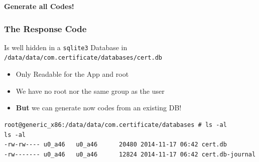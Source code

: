 \documentclass[12pt,a4paper]{beamer}
\newcommand{\mybox}[1]{\par\noindent\colorbox{shadecolor}
{\color{textcolor}\parbox{\dimexpr\textwidth-2\fboxsep\relax}{\fontsize{3em}{3.5em}\selectfont\textbf{{#1}}}}}
\begin{document}
{
\begin{frame}[plain]

\mybox{Generate all Codes!}

\end{frame}
}

\begin{frame}[fragile]
	\frametitle{The Response Code}
	Is well hidden in a \texttt{sqlite3} Database in \texttt{/data/data/com.certificate/databases/cert.db}
	\begin{itemize}
		\item Only Readable for the App and root
		\item We have no root nor the same group as the user
		\item \textbf{But} we can generate now codes from an existing DB!
	\end{itemize}
	
	\begin{lstlisting}[basicstyle=\tiny]
root@generic_x86:/data/data/com.certificate/databases # ls -al
ls -al
-rw-rw---- u0_a46   u0_a46      20480 2014-11-17 06:42 cert.db
-rw------- u0_a46   u0_a46      12824 2014-11-17 06:42 cert.db-journal
\end{lstlisting}
\end{frame}
\end{document}
